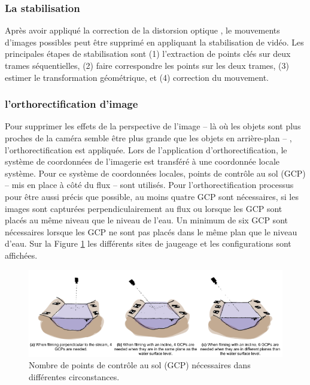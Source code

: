 \documentclass[
]{article}
\begin{document}
\hypertarget{la-stabilisation}{%
\subsubsection*{La stabilisation}\label{la-stabilisation}}

Après avoir appliqué la correction de la distorsion optique , le mouvements d'images possibles
peut être supprimé en appliquant la stabilisation de vidéo. Les principales étapes de
stabilisation sont (1) l'extraction de points clés sur deux trames séquentielles,
(2) faire correspondre les points sur les deux trames, (3) estimer le
transformation géométrique, et (4) correction du mouvement.

\hypertarget{lorthorectification-dimage}{%
\subsubsection*{l'orthorectification d'image}\label{lorthorectification-dimage}}

Pour supprimer les effets de la perspective de l'image -- là où les objets sont plus proches
de la caméra semble être plus grande que les objets en arrière-plan -- ,
l'orthorectification est appliquée. Lors de l'application d'orthorectification,
le système de coordonnées de l'imagerie est transféré à une coordonnée locale
système. Pour ce système de coordonnées locales, points de contrôle au sol (GCP) --
mis en place à côté du flux -- sont utilisés. Pour l'orthorectification
processus pour être aussi précis que possible, au moins quatre GCP sont nécessaires, si
les images sont capturées perpendiculairement au flux ou lorsque les GCP
sont placés au même niveau que le niveau de l'eau. Un minimum de six
GCP sont nécessaires lorsque les GCP ne sont pas placés dans le même plan que le
niveau d'eau. Sur la Figure \ref{fig:ortho} les différents sites de jaugeage
et les configurations sont affichées.



\begin{figure}
\includegraphics[width=1\linewidth]{images/ortho} \caption{Nombre de points de contrôle au sol (GCP) nécessaires dans différentes circonstances.}\label{fig:ortho}
\end{figure}
\end{document}
